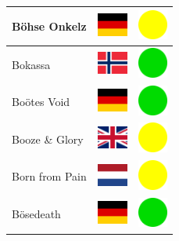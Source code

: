 \documentclass[12pt, a4paper, twoside]{report}
\begin{document}
\begin{center}
\begin{longtable}{|p{5cm}|p{2cm}|p{2cm}|}
Böhse Onkelz & \includegraphics[width=1cm]{4x3/de} & \includegraphics[width=1cm]{likes/m} \\ \hline
Bokassa & \includegraphics[width=1cm]{4x3/no} & \includegraphics[width=1cm]{likes/y} \\ \hline
Boötes Void & \includegraphics[width=1cm]{4x3/de} & \includegraphics[width=1cm]{likes/y} \\ \hline
Booze \& Glory & \includegraphics[width=1cm]{4x3/gb} & \includegraphics[width=1cm]{likes/m} \\ \hline
Born from Pain & \includegraphics[width=1cm]{4x3/nl} & \includegraphics[width=1cm]{likes/m} \\ \hline
Bösedeath & \includegraphics[width=1cm]{4x3/de} & \includegraphics[width=1cm]{likes/y} \\ \hline

\end{longtable}
\end{center}
\end{document}
